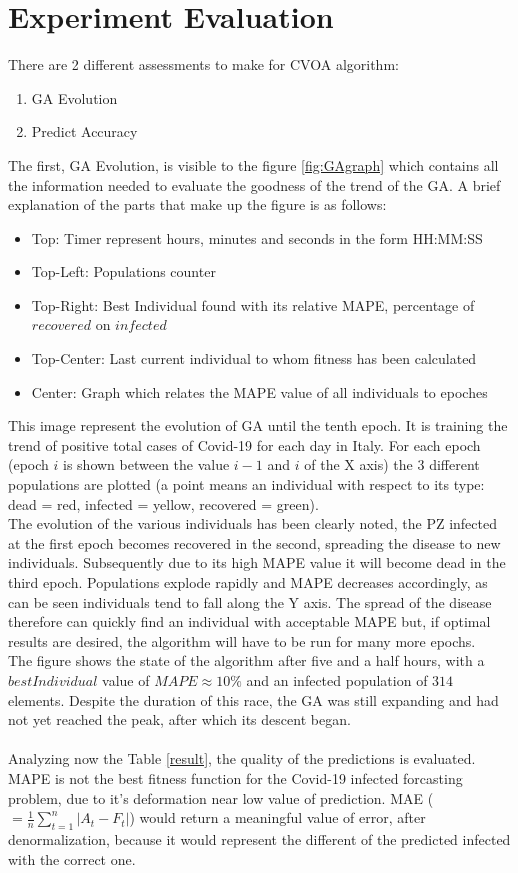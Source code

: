 \documentclass[letterpaper]{article}%
\begin{document}
\section{Experiment Evaluation}
There are 2 different assessments to make for CVOA algorithm:
\begin{enumerate}[label=\arabic*)]
\item GA Evolution
\item Predict Accuracy
\end{enumerate}
The first, GA Evolution, is visible to the figure \ref{fig:GAgraph} which contains all the information needed to evaluate the goodness of the trend of the GA. A brief explanation of the parts that make up the figure is as follows:
\begin{itemize}
\item Top: Timer represent hours, minutes and seconds in the form HH:MM:SS
\item Top-Left: Populations counter
\item Top-Right: Best Individual found with its relative MAPE, percentage of $recovered$ on $infected$
\item Top-Center: Last current individual to whom fitness has been calculated
\item Center: Graph which relates the MAPE value of all individuals to epoches 
\end{itemize}
This image represent the evolution of GA until the tenth epoch. It is training the trend of positive total cases of Covid-19 for each day in Italy. For each epoch (epoch $i$ is shown between the value $i-1$ and $i$ of the X axis) the 3 different populations are plotted (a point means an individual with respect to its type: dead = red, infected = yellow, recovered = green).\\
The evolution of the various individuals has been clearly noted, the PZ infected at the first epoch becomes recovered in the second, spreading the disease to new individuals. Subsequently due to its high MAPE value it will become dead in the third epoch.
Populations explode rapidly and MAPE decreases accordingly, as can be seen individuals tend to fall along the Y axis. The spread of the disease therefore can quickly find an individual with acceptable MAPE but, if optimal results are desired, the algorithm will have to be run for many more epochs. \\The figure shows the state of the algorithm after five and a half hours, with a $bestIndividual$ value of $MAPE \approx 10\%$ and an infected population of $314$ elements. Despite the duration of this race, the GA was still expanding and had not yet reached the peak, after which its descent began.\\
\\
Analyzing now the Table \ref{result}, the quality of the predictions is evaluated.\\
MAPE is not the best fitness function for the Covid-19 infected forcasting problem, due to it's deformation near low value of prediction. MAE  ($ = \frac{1}{n}\sum_{t=1}^{n}|A_t - F_t| $) would return a meaningful value of error, after denormalization, because it would represent the different of the predicted infected with the correct one.
\end{document}
